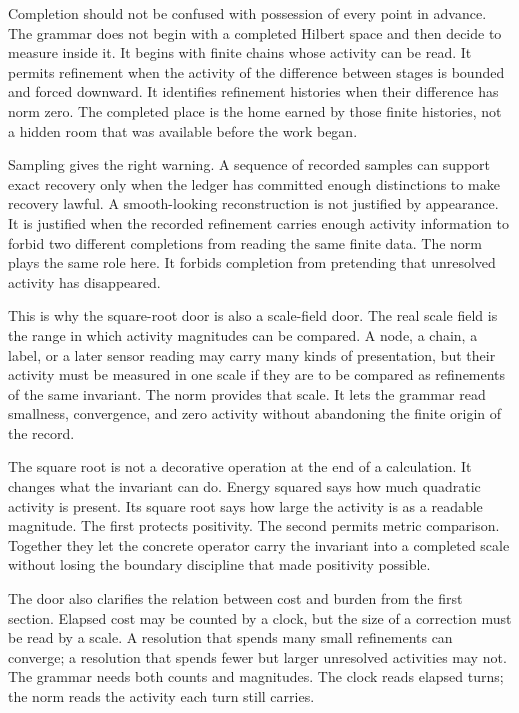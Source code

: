 Completion should not be confused with possession of every point in advance.
The grammar does not begin with a completed Hilbert space and then decide to
measure inside it. It begins with finite chains whose activity can be read.
It permits refinement when the activity of the difference between stages is
bounded and forced downward. It identifies refinement histories when their
difference has norm zero. The completed place is the home earned by those
finite histories, not a hidden room that was available before the work began.

Sampling gives the right warning. A sequence of recorded samples can support
exact recovery only when the ledger has committed enough distinctions to
make recovery lawful. A smooth-looking reconstruction is not justified by
appearance. It is justified when the recorded refinement carries enough
activity information to forbid two different completions from reading the
same finite data. The norm plays the same role here. It forbids completion
from pretending that unresolved activity has disappeared.

This is why the square-root door is also a scale-field door. The real scale
field is the range in which activity magnitudes can be compared. A node, a
chain, a label, or a later sensor reading may carry many kinds of
presentation, but their activity must be measured in one scale if they are
to be compared as refinements of the same invariant. The norm provides that
scale. It lets the grammar read smallness, convergence, and zero activity
without abandoning the finite origin of the record.

The square root is not a decorative operation at the end of a calculation.
It changes what the invariant can do. Energy squared says how much
quadratic activity is present. Its square root says how large the activity
is as a readable magnitude. The first protects positivity. The second
permits metric comparison. Together they let the concrete operator carry
the invariant into a completed scale without losing the boundary discipline
that made positivity possible.

The door also clarifies the relation between cost and burden from the first
section. Elapsed cost may be counted by a clock, but the size of a correction
must be read by a scale. A resolution that spends many small refinements can
converge; a resolution that spends fewer but larger unresolved activities
may not. The grammar needs both counts and magnitudes. The clock reads
elapsed turns; the norm reads the activity each turn still carries.

